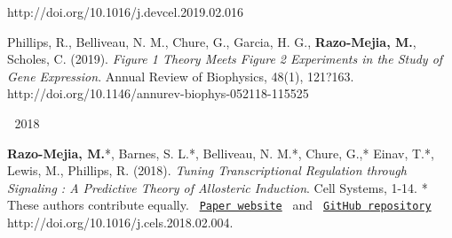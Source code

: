 \begin{cventries}
{\begin{cvitems}
{\begin{flushleft}
            http://doi.org/10.1016/j.devcel.2019.02.016
          \end{flushleft}
        }
        \item {
          \begin{flushleft}
            Phillips, R., Belliveau, N. M., Chure, G., Garcia, H. G.,
            \textbf{Razo-Mejia, M.}, Scholes, C. (2019). \textit{Figure 1
            Theory Meets Figure 2 Experiments in the Study of Gene Expression}.
            Annual Review of Biophysics, 48(1), 121?163.\linebreak
            http://doi.org/10.1146/annurev-biophys-052118-115525
          \end{flushleft}
        }
      \end{cvitems}
    }

\cventry
    {$\;$}
    {2018}
    {$\;$}
    {$\;$}
    {
      \begin{cvitems}
        \item {
        \begin{flushleft}
          \textbf{Razo-Mejia, M.}*, Barnes, S. L.*, Belliveau, N. M.*, Chure,
          G.,* Einav, T.*, Lewis, M., Phillips, R. (2018). \textit{Tuning
          Transcriptional Regulation through Signaling : A Predictive Theory of
          Allosteric Induction}. Cell Systems, 1-14. * These authors contribute
          equally. 
          \texttt{
            \href{http://www.rpgroup.caltech.edu/mwc_induction/}{Paper website} 
            }
            and
            \texttt{
            \href{http://www.github.com/rpgroup-pboc/mwc_induction}{GitHub repository}
            }
          \linebreak
          http://doi.org/10.1016/j.cels.2018.02.004.
        \end{flushleft}
        }
      \end{cvitems}
    }



\end{cventries}
